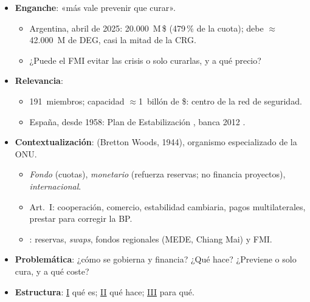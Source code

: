 \documentclass{article}
\begin{document}
\cabecerarepaso
\begin{columnas}

\begin{itemize}
\item \textbf{Enganche}: «más vale prevenir que curar».
  \begin{itemize}
  \item Argentina, abril de 2025: 20.000~M\,\$ (479\,\% de la cuota); debe $\approx$42.000~M de DEG, casi la mitad de la CRG.
  \item ¿Puede el FMI evitar las crisis o solo curarlas, y a qué precio?
  \end{itemize}
\item \textbf{Relevancia}:
  \begin{itemize}
  \item 191~miembros; capacidad $\approx$1~billón de \$: centro de la red de seguridad.
  \item España, desde 1958: Plan de Estabilización , banca 2012 .
  \end{itemize}
\item \textbf{Contextualización}:  (Bretton Woods, 1944), organismo especializado de la ONU.
  \begin{itemize}
  \item \emph{Fondo} (cuotas), \emph{monetario} (refuerza reservas; no financia proyectos), \emph{internacional}.
  \item Art.~I: cooperación, comercio, estabilidad cambiaria, pagos multilaterales, prestar para corregir la BP.
  \item {}: reservas, \emph{swaps}, fondos regionales (MEDE, Chiang Mai) y FMI.
  \end{itemize}
\item \textbf{Problemática}: ¿cómo se gobierna y financia? ¿Qué hace? ¿Previene o solo cura, y a qué coste?
\item \textbf{Estructura}: \hyperref[rep:I]{I} qué es; \hyperref[rep:II]{II} qué hace; \hyperref[rep:III]{III} para qué.
\end{itemize}


\end{columnas}
\end{document}
